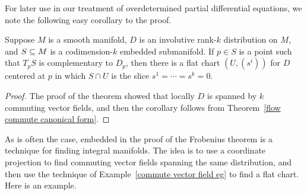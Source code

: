 For later use in our treatment of overdetermined partial differential equations, we note the following easy corollary to the proof.
\begin{corollary}\label{distribution complementary submani is slice}
Suppose $M$ is a smooth manifold, $D$ is an involutive rank-$k$ distribution on $M$, and $S\subseteq M$ is a codimension-$k$ embedded submanifold. If $p\in S$ is a point such that $T_pS$ is complementary to $D_p$, then there is a flat chart $(U,(s^i))$ for $D$ centered at $p$ in which $S\cap U$ is the slice $s^1=\cdots=s^k=0$.
\end{corollary}
\begin{proof}
The proof of the theorem showed that locally $D$ is spanned by $k$ commuting vector fields, and then the corollary follows from Theorem~\ref{flow commute canonical form}.
\end{proof}
As is often the case, embedded in the proof of the Frobenius theorem is a technique for finding integral manifolds. The idea is to use a coordinate projection to find commuting vector fields spanning the same distribution, and then use the technique of Example~\ref{commute vector field eg} to find a flat chart. Here is an example.
